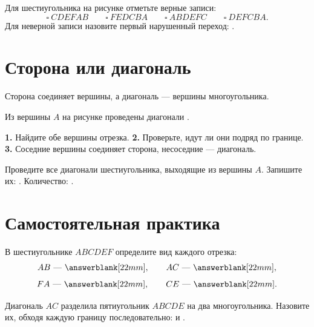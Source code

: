 \begin{practicebox}
  Для шестиугольника на рисунке отметьте верные записи:
  \[
    \square\ CDEFAB\qquad
    \square\ FEDCBA\qquad
    \square\ ABDEFC\qquad
    \square\ DEFCBA.
  \]
  Для неверной записи назовите первый нарушенный переход:
  \answerblank[55mm].
\end{practicebox}

\section{Сторона или диагональ}

\diagonalfigure

\begin{fillbox}
  Сторона соединяет \answerblank[30mm] вершины, а диагональ ---
  \answerblank[30mm] вершины многоугольника.

  Из вершины $A$ на рисунке проведены диагонали
  \answerblank[55mm].
\end{fillbox}

\begin{notebox}[Алгоритм]
  \textbf{1.} Найдите обе вершины отрезка.
  \textbf{2.} Проверьте, идут ли они подряд по границе.
  \textbf{3.} Соседние вершины соединяет сторона, несоседние --- диагональ.
\end{notebox}

\begin{practicebox}
  Проведите все диагонали шестиугольника, выходящие из вершины $A$.
  \hexagondiagonalsstudent
  Запишите их: \answerblank[55mm]. Количество: \answerblank[15mm].
\end{practicebox}

\section{Самостоятельная практика}

\begin{practicebox}
  В шестиугольнике $ABCDEF$ определите вид каждого отрезка:
  \[
    AB\text{ --- }\answerblank[22mm],\qquad
    AC\text{ --- }\answerblank[22mm],
  \]
  \[
    FA\text{ --- }\answerblank[22mm],\qquad
    CE\text{ --- }\answerblank[22mm].
  \]
\end{practicebox}

\pentagonsplitfigure

\begin{practicebox}
  Диагональ $AC$ разделила пятиугольник $ABCDE$ на два многоугольника.
  Назовите их, обходя каждую границу последовательно:
  \answerblank[45mm] и \answerblank[55mm].
\end{practicebox}

